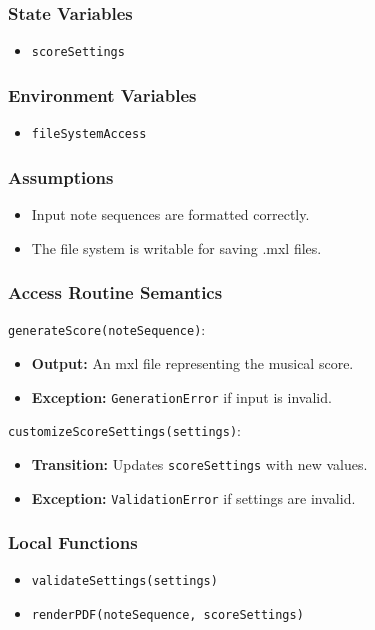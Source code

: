\documentclass[12pt, titlepage]{article}
\begin{document}
\subsubsection{State Variables}  
\begin{itemize}  
    \item \texttt{scoreSettings}  
\end{itemize}  

\subsubsection{Environment Variables}  
\begin{itemize}  
    \item \texttt{fileSystemAccess}  
\end{itemize}  

\subsubsection{Assumptions}  
\begin{itemize}  
    \item Input note sequences are formatted correctly.  
    \item The file system is writable for saving .mxl files.  
\end{itemize}  

\subsubsection{Access Routine Semantics}  

\noindent \texttt{generateScore(noteSequence)}:
\begin{itemize}  
    \item \textbf{Output:} An mxl file representing the musical score.  
    \item \textbf{Exception:} \texttt{GenerationError} if input is invalid.  
\end{itemize}  

\noindent \texttt{customizeScoreSettings(settings)}:
\begin{itemize}  
    \item \textbf{Transition:} Updates \texttt{scoreSettings} with new values.  
    \item \textbf{Exception:} \texttt{ValidationError} if settings are invalid.  
\end{itemize}  

\subsubsection{Local Functions}  
\begin{itemize}  
    \item \texttt{validateSettings(settings)}  
    \item \texttt{renderPDF(noteSequence, scoreSettings)}  
\end{itemize}  
\end{document}
